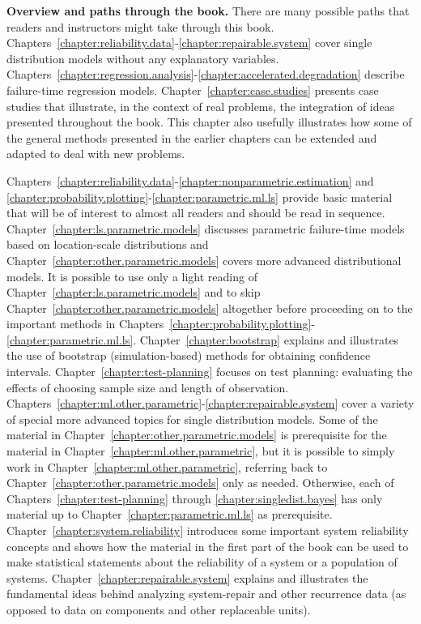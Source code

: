 \noindent
{\bf Overview and paths through the book.} There are many possible
paths that readers and instructors might take through this book.
Chapters~\ref{chapter:reliability.data}-\ref{chapter:repairable.system}
cover single distribution models without any explanatory
variables.
Chapters~\ref{chapter:regression.analysis}-\ref{chapter:accelerated.degradation}
describe failure-time regression models.
Chapter~\ref{chapter:case.studies} presents case studies that
illustrate, in the context of real problems, the integration of
ideas presented throughout the book. This chapter also usefully
illustrates how some of the general methods presented in the earlier
chapters can be extended and adapted to deal with new problems.

Chapters~\ref{chapter:reliability.data}-\ref{chapter:nonparametric.estimation}
and \ref{chapter:probability.plotting}-\ref{chapter:parametric.ml.ls}
provide basic material that will be of interest to almost all readers
and should be read in sequence.
Chapter~\ref{chapter:ls.parametric.models} discusses parametric
failure-time models based on location-scale distributions and
Chapter~\ref{chapter:other.parametric.models} covers more advanced
distributional models.  It is possible to use only a light reading of
Chapter~\ref{chapter:ls.parametric.models} and to skip
Chapter~\ref{chapter:other.parametric.models} altogether before
proceeding on to the important methods in
Chapters~\ref{chapter:probability.plotting}-\ref{chapter:parametric.ml.ls}.
Chapter~\ref{chapter:bootstrap} explains and illustrates the use of
bootstrap (simulation-based) methods for obtaining confidence
intervals. Chapter~\ref{chapter:test-planning} focuses on test
planning: evaluating the effects of choosing sample size and length of
observation.
Chapters~\ref{chapter:ml.other.parametric}-\ref{chapter:repairable.system}
cover a variety of special more advanced topics for single
distribution models. Some of the material in
Chapter~\ref{chapter:other.parametric.models} is prerequisite for the
material in Chapter~\ref{chapter:ml.other.parametric}, but it is
possible to simply work in Chapter~\ref{chapter:ml.other.parametric},
referring back to Chapter~\ref{chapter:other.parametric.models} only
as needed.  Otherwise, each of Chapters~\ref{chapter:test-planning}
through
\ref{chapter:singledist.bayes} has only material up to
Chapter~\ref{chapter:parametric.ml.ls} as prerequisite.
Chapter~\ref{chapter:system.reliability} introduces some important
system reliability concepts and shows how the material in the first
part of the book can be used to make statistical statements about the
reliability of a system or a population of systems.
Chapter~\ref{chapter:repairable.system} explains and illustrates the
fundamental ideas behind analyzing system-repair and other recurrence data (as
opposed to data on components and other replaceable units).

